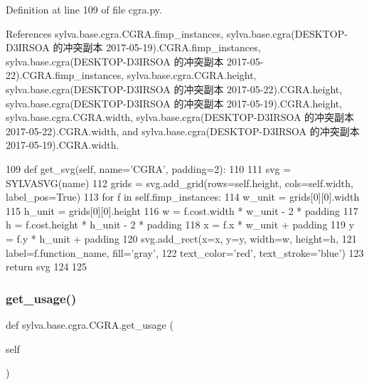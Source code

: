 Definition at line 109 of file cgra.\+py.



References sylva.\+base.\+cgra.\+C\+G\+R\+A.\+fimp\+\_\+instances, sylva.\+base.\+cgra(\+D\+E\+S\+K\+T\+O\+P-\/\+D3\+I\+R\+S\+O\+A 的冲突副本 2017-\/05-\/19).\+C\+G\+R\+A.\+fimp\+\_\+instances, sylva.\+base.\+cgra(\+D\+E\+S\+K\+T\+O\+P-\/\+D3\+I\+R\+S\+O\+A 的冲突副本 2017-\/05-\/22).\+C\+G\+R\+A.\+fimp\+\_\+instances, sylva.\+base.\+cgra.\+C\+G\+R\+A.\+height, sylva.\+base.\+cgra(\+D\+E\+S\+K\+T\+O\+P-\/\+D3\+I\+R\+S\+O\+A 的冲突副本 2017-\/05-\/22).\+C\+G\+R\+A.\+height, sylva.\+base.\+cgra(\+D\+E\+S\+K\+T\+O\+P-\/\+D3\+I\+R\+S\+O\+A 的冲突副本 2017-\/05-\/19).\+C\+G\+R\+A.\+height, sylva.\+base.\+cgra.\+C\+G\+R\+A.\+width, sylva.\+base.\+cgra(\+D\+E\+S\+K\+T\+O\+P-\/\+D3\+I\+R\+S\+O\+A 的冲突副本 2017-\/05-\/22).\+C\+G\+R\+A.\+width, and sylva.\+base.\+cgra(\+D\+E\+S\+K\+T\+O\+P-\/\+D3\+I\+R\+S\+O\+A 的冲突副本 2017-\/05-\/19).\+C\+G\+R\+A.\+width.


\begin{DoxyCode}
109     \textcolor{keyword}{def }get\_svg(self, name='CGRA', padding=2):
110 
111         svg = SYLVASVG(name)
112         grids = svg.add\_grid(rows=self.height, cols=self.width, label\_pos=\textcolor{keyword}{True})
113         \textcolor{keywordflow}{for} f \textcolor{keywordflow}{in} self.fimp\_instances:
114             w\_unit = grids[0][0].width
115             h\_unit = grids[0][0].height
116             w = f.cost.width * w\_unit - 2 * padding
117             h = f.cost.height * h\_unit - 2 * padding
118             x = f.x * w\_unit + padding
119             y = f.y * h\_unit + padding
120             svg.add\_rect(x=x, y=y, width=w, height=h,
121                          label=f.function\_name, fill=\textcolor{stringliteral}{'gray'},
122                          text\_color=\textcolor{stringliteral}{'red'}, text\_stroke=\textcolor{stringliteral}{'blue'})
123         \textcolor{keywordflow}{return} svg
124 
125 
\end{DoxyCode}
\mbox{\label{classsylva_1_1base_1_1cgra_1_1_c_g_r_a_a893cfb7c3fed9ebfb0187693eb132e2f}} 
\subsubsection{\texorpdfstring{get\+\_\+usage()}{get\_usage()}}
{\footnotesize\ttfamily def sylva.\+base.\+cgra.\+C\+G\+R\+A.\+get\+\_\+usage (\begin{DoxyParamCaption}\item[{}]{self }\end{DoxyParamCaption})}



